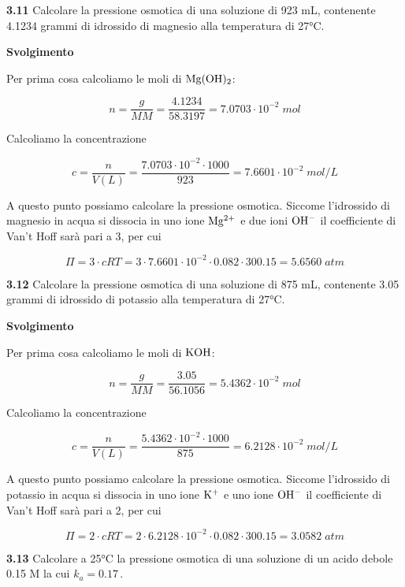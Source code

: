 \vspace{0.2cm}\textbf{3.11} Calcolare la pressione osmotica di una soluzione di 923 mL, contenente 4.1234 grammi di idrossido di magnesio alla temperatura di 27°C. 

\vspace{0.2cm}\large\textbf{Svolgimento}\normalsize

\vspace{0.2cm}Per prima cosa calcoliamo le moli di $\rm Mg(OH)_2$:

$$n=\frac{g}{MM}=\frac{4.1234}{58.3197}=7.0703 \cdot 10^{-2}\;mol$$

Calcoliamo la concentrazione

$$c=\frac{n}{V(L)}=\frac{7.0703 \cdot 10^{-2} \cdot 1000}{923}=7.6601 \cdot 10^{-2}\;mol/L$$

A questo punto possiamo calcolare la pressione osmotica. Siccome l'idrossido di magnesio in acqua si dissocia in uno ione $\rm Mg^{2+}$ e due ioni $\rm OH^-$ il coefficiente di Van't Hoff sarà pari a 3, per cui

$$\Pi=3 \cdot cRT
=3 \cdot 7.6601 \cdot 10^{-2} \cdot 0.082 \cdot 300.15
=5.6560\;atm$$

\vspace{0.2cm}\textbf{3.12} Calcolare la pressione osmotica di una soluzione di 875 mL, contenente 3.05 grammi di idrossido
di potassio alla temperatura di 27°C.

\vspace{0.2cm}\large\textbf{Svolgimento}\normalsize

\vspace{0.2cm}Per prima cosa calcoliamo le moli di $\rm KOH$:

$$n=\frac{g}{MM}=\frac{3.05}{56.1056}=5.4362 \cdot 10^{-2}\;mol$$

Calcoliamo la concentrazione

$$c=\frac{n}{V(L)}=\frac{5.4362 \cdot 10^{-2} \cdot 1000}{875}=6.2128 \cdot 10^{-2}\;mol/L$$

A questo punto possiamo calcolare la pressione osmotica. Siccome l'idrossido di potassio in acqua si dissocia in uno ione $\rm K^{+}$ e uno ione $\rm OH^-$ il coefficiente di Van't Hoff sarà pari a 2, per cui

$$\Pi=2 \cdot cRT
=2 \cdot 6.2128 \cdot 10^{-2} \cdot 0.082 \cdot 300.15
=3.0582\;atm$$

\vspace{0.2cm}\textbf{3.13} Calcolare a 25°C la pressione osmotica di una soluzione di un acido debole 0.15 M la cui $k_a=0.17$\,.

